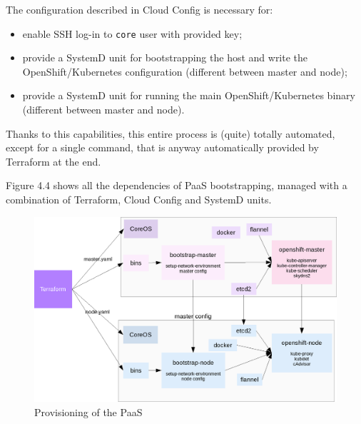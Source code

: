 The configuration described in Cloud Config is necessary for:
\begin{itemize}
\item enable SSH log-in to \texttt{core} user with provided key;
\item provide a SystemD unit for bootstrapping the host and write the OpenShift/Kubernetes configuration (different between master and node);
\item provide a SystemD unit for running the main OpenShift/Kubernetes binary (different between master and node).
\end{itemize}

Thanks to this capabilities, this entire process is (quite) totally automated, except for a single command, that is anyway automatically provided by Terraform at the end.

Figure 4.4 shows all the dependencies of PaaS bootstrapping, managed with a combination of Terraform, Cloud Config and SystemD units.

\begin{figure}[htbp]
\centering
\includegraphics{media/ch4-bootstrap.png}
\caption{Provisioning of the PaaS}
\end{figure}
